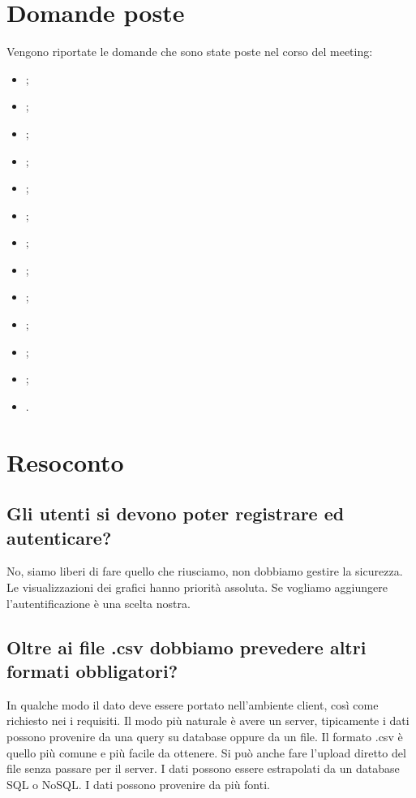 \documentclass{article}
\begin{document}
\section{Domande poste}
\label{sec:domande_poste}
	Vengono riportate le domande che sono state poste nel corso del meeting:
	\begin{itemize}
		\item {};
		\item {};
		\item {};
		\item {};
		\item {};
		\item {};
		\item {};
		\item {};
		\item {};
		\item {};
		\item {};
		\item {};
        \item {}.
    	\end{itemize}

\section{Resoconto}
\label{sec:resoconto}

	\subsection{Gli utenti si devono poter registrare ed autenticare?}
	\label{sub:domanda_01}
    No, siamo liberi di fare quello che riusciamo, non dobbiamo gestire la sicurezza. Le visualizzazioni dei grafici hanno priorità assoluta. Se vogliamo aggiungere l'autentificazione è una scelta nostra.
    
    \subsection{Oltre ai file .csv dobbiamo prevedere altri formati obbligatori?}
	\label{sub:domanda_02}
    In qualche modo il dato deve essere portato nell'ambiente client, così come richiesto nei i requisiti. Il modo più naturale è avere un server, tipicamente i dati possono provenire da una query su database oppure da un file. Il formato .csv è quello più comune e più facile da ottenere. Si può anche fare l'upload diretto del file senza passare per il server. I dati possono essere estrapolati da un database SQL o NoSQL. I dati possono provenire da più fonti.
\end{document}
